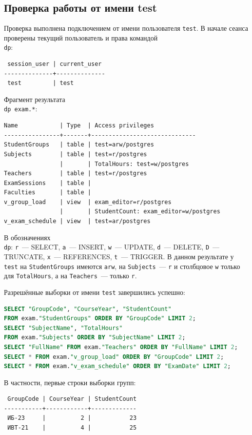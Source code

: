 \documentclass[12pt,a4paper]{article}
\begin{document}
\subsection*{Проверка работы от имени test}
Проверка выполнена подключением от имени пользователя \texttt{test}.
В начале сеанса проверены текущий пользователь и права командой \texttt{\\dp}:
\begin{lstlisting}
 session_user | current_user
--------------+--------------
 test         | test
\end{lstlisting}
Фрагмент результата \texttt{\\dp exam.*}:
\begin{lstlisting}
Name            | Type  | Access privileges
----------------+-------+------------------------------
StudentGroups   | table | test=arw/postgres
Subjects        | table | test=r/postgres
                |       | TotalHours: test=w/postgres
Teachers        | table | test=r/postgres
ExamSessions    | table |
Faculties       | table |
v_group_load    | view  | exam_editor=r/postgres
                |       | StudentCount: exam_editor=w/postgres
v_exam_schedule | view  | test=ar/postgres
\end{lstlisting}
В обозначениях \texttt{\\dp}: \texttt{r}~--- SELECT, \texttt{a}~---
INSERT, \texttt{w}~--- UPDATE, \texttt{d}~--- DELETE, \texttt{D}~---
TRUNCATE, \texttt{x}~--- REFERENCES, \texttt{t}~--- TRIGGER.
В данном результате у \texttt{test} на \texttt{StudentGroups} имеются
\texttt{arw}, на \texttt{Subjects}~--- \texttt{r} и столбцовое \texttt{w}
только для \texttt{TotalHours}, а на \texttt{Teachers}~--- только \texttt{r}.

Разрешённые выборки от имени \texttt{test} завершились успешно:
\begin{lstlisting}[language=SQL]
SELECT "GroupCode", "CourseYear", "StudentCount"
FROM exam."StudentGroups" ORDER BY "GroupCode" LIMIT 2;
SELECT "SubjectName", "TotalHours"
FROM exam."Subjects" ORDER BY "SubjectName" LIMIT 2;
SELECT "FullName" FROM exam."Teachers" ORDER BY "FullName" LIMIT 2;
SELECT * FROM exam."v_group_load" ORDER BY "GroupCode" LIMIT 2;
SELECT * FROM exam."v_exam_schedule" ORDER BY "ExamDate" LIMIT 2;
\end{lstlisting}
В частности, первые строки выборки групп:
\begin{lstlisting}
 GroupCode | CourseYear | StudentCount
-----------+------------+-------------
 ИБ-23     |          2 |           23
 ИВТ-21    |          4 |           25
\end{lstlisting}
\end{document}
